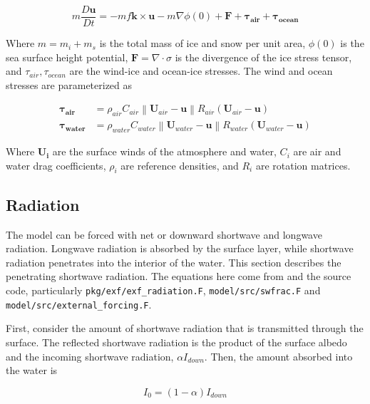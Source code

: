 \documentclass[11pt]{article}
\begin{document}
\begin{equation}
m \frac{D \mathbf{u}}{D t} = -m f \mathbf{k}\times \mathbf{u} - m\nabla \phi(0) + \mathbf{F} + \mathbf{\tau_{air}} + \mathbf{\tau_{ocean}}
\end{equation}

Where  $m = m_i + m_s$ is the total mass of ice and snow per unit area, $\phi(0)$ is the sea surface height potential, $\mathbf{F} = \nabla \cdot \sigma$ is the divergence of the ice stress tensor, and $\tau_{air}, \tau_{ocean}$ are the wind-ice and ocean-ice stresses. The wind and ocean stresses are parameterized as

\begin{equation}
\begin{aligned}
\mathbf{\tau_{air}} &= \rho_{air}C_{air}\left \| \mathbf{U}_{air} - \mathbf{u} \right \| R_{air}\left(\mathbf{U}_{air} - \mathbf{u}\right) \\
\mathbf{\tau_{water}} &= \rho_{water}C_{water}\left \| \mathbf{U}_{water} - \mathbf{u} \right \| R_{water}\left(\mathbf{U}_{water} - \mathbf{u}\right)
\end{aligned}
\end{equation}

Where $\mathbf{U_i}$ are the surface winds of the atmosphere and water, $C_i$ are air and water drag coefficients, $\rho_i$ are reference densities, and $R_i$ are rotation matrices.

\subsection{Radiation}
\label{sec:MITgcmRadiation}
The model can be forced with net or downward shortwave and longwave radiation. Longwave radiation is absorbed by the surface layer, while shortwave radiation penetrates into the interior of the water. This section describes the penetrating shortwave radiation. The equations here come from \cite{PaulsonSimpson1977} and the source code, particularly \verb|pkg/exf/exf_radiation.F|, \verb|model/src/swfrac.F| and \verb|model/src/external_forcing.F|.

First, consider the amount of shortwave radiation that is transmitted through the surface. The reflected shortwave radiation is the product of the surface albedo and the incoming shortwave radiation, $\alpha I_{down}$. Then, the amount absorbed into the water is

\begin{equation}
I_0 = (1 - \alpha) I_{down}
\end{equation}
\end{document}
